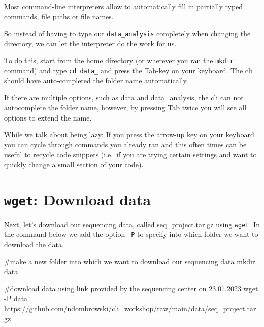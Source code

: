 \documentclass[
  letterpaper,
  DIV=11,
  numbers=noendperiod]{scrreprt}
\newenvironment{Shaded}{}{}
\newcommand{\AttributeTok}[1]{\textcolor[rgb]{0.84,0.23,0.29}{#1}}
\newcommand{\CommentTok}[1]{\textcolor[rgb]{0.42,0.45,0.49}{#1}}
\newcommand{\FunctionTok}[1]{\textcolor[rgb]{0.44,0.26,0.76}{#1}}
\newcommand{\NormalTok}[1]{\textcolor[rgb]{0.14,0.16,0.18}{#1}}
\begin{document}
\begin{tcolorbox}[enhanced jigsaw, breakable, left=2mm, opacitybacktitle=0.6, coltitle=black, toprule=.15mm, colframe=quarto-callout-tip-color-frame, opacityback=0, bottomtitle=1mm, rightrule=.15mm, colback=white, toptitle=1mm, leftrule=.75mm, titlerule=0mm, bottomrule=.15mm, title=\textcolor{quarto-callout-tip-color}{\faLightbulb}\hspace{0.5em}{Tip: Command-line completion}, colbacktitle=quarto-callout-tip-color!10!white, arc=.35mm]

Most command-line interpreters allow to automatically fill in partially
typed commands, file paths or file names.

So instead of having to type out \texttt{data\_analysis} completely when
changing the directory, we can let the interpreter do the work for us.

To do this, start from the home directory (or wherever you ran the
\texttt{mkdir} command) and type \texttt{cd\ data\_} and press the
Tab-key on your keyboard. The cli should have auto-completed the folder
name automatically.

If there are multiple options, such as data and data\_analysis, the cli
can not autocomplete the folder name, however, by pressing Tab twice you
will see all options to extend the name.

While we talk about being lazy: If you press the arrow-up key on your
keyboard you can cycle through commands you already ran and this often
times can be useful to recycle code snippets (i.e.~if you are trying
certain settings and want to quickly change a small section of your
code).

\end{tcolorbox}

\section{\texorpdfstring{\texttt{wget}: Download
data}{wget: Download data}}\label{wget-download-data}

Next, let's download our sequencing data, called seq\_project.tar.gz
using \texttt{wget}. In the command below we add the option \texttt{-P}
to specify into which folder we want to download the data.

\begin{Shaded}
\begin{Highlighting}[]
\CommentTok{\#make a new folder into which we want to download our sequencing data}
\FunctionTok{mkdir}\NormalTok{ data}

\CommentTok{\#download data using link provided by the sequencing center on 23.01.2023}
\FunctionTok{wget} \AttributeTok{{-}P}\NormalTok{ data https://github.com/ndombrowski/cli\_workshop/raw/main/data/seq\_project.tar.gz}
\end{Highlighting}
\end{Shaded}
\end{document}
